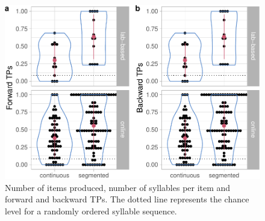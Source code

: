 \documentclass[
]{article}
\begin{document}
\begin{figure}

{\centering \includegraphics[width=0.8\linewidth]{segmentation_recall_combined_for_revision3_files/figure-latex/recall-general-measures-tp-plot-tps-1} 

}

\caption{Number of items produced, number of syllables per item and forward and backward TPs. The dotted line represents the chance level for a randomly ordered syllable sequence.}\label{fig:recall-general-measures-tp-plot-tps}
\end{figure}
\end{document}
